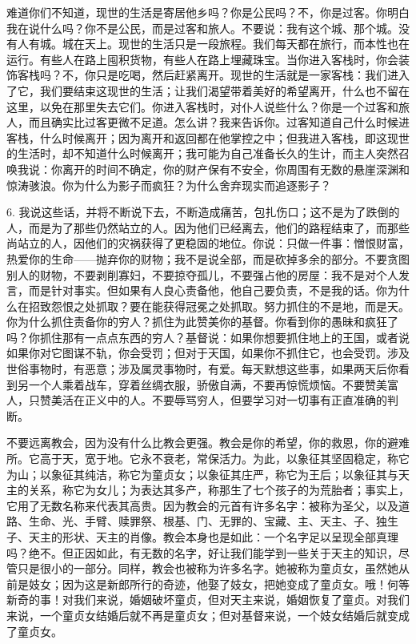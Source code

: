 难道你们不知道，现世的生活是寄居他乡吗？你是公民吗？不，你是过客。你明白我在说什么吗？你不是公民，而是过客和旅人。不要说：我有这个城、那个城。没有人有城。城在天上。现世的生活只是一段旅程。我们每天都在旅行，而本性也在运行。有些人在路上囤积货物，有些人在路上埋藏珠宝。当你进入客栈时，你会装饰客栈吗？不，你只是吃喝，然后赶紧离开。现世的生活就是一家客栈：我们进入了它，我们要结束这现世的生活；让我们渴望带着美好的希望离开，什么也不留在这里，以免在那里失去它们。你进入客栈时，对仆人说些什么？你是一个过客和旅人，而且确实比过客更微不足道。怎么讲？我来告诉你。过客知道自己什么时候进客栈，什么时候离开；因为离开和返回都在他掌控之中；但我进入客栈，即这现世的生活时，却不知道什么时候离开；我可能为自己准备长久的生计，而主人突然召唤我说：你离开的时间不确定，你的财产保有不安全，你周围有无数的悬崖深渊和惊涛骇浪。你为什么为影子而疯狂？为什么舍弃现实而追逐影子？\par

6. 我说这些话，并将不断说下去，不断造成痛苦，包扎伤口；这不是为了跌倒的人，而是为了那些仍然站立的人。因为他们已经离去，他们的路程结束了，而那些尚站立的人，因他们的灾祸获得了更稳固的地位。你说：只做一件事：憎恨财富，热爱你的生命——抛弃你的财物；我不是说全部，而是砍掉多余的部分。不要贪图别人的财物，不要剥削寡妇，不要掠夺孤儿，不要强占他的房屋：我不是对个人发言，而是针对事实。但如果有人良心责备他，他自己要负责，不是我的话。你为什么在招致怨恨之处抓取？要在能获得冠冕之处抓取。努力抓住的不是地，而是天。你为什么抓住责备你的穷人？抓住为此赞美你的基督。你看到你的愚昧和疯狂了吗？你抓住那有一点点东西的穷人？基督说：如果你想要抓住地上的王国，或者说如果你对它图谋不轨，你会受罚；但对于天国，如果你不抓住它，也会受罚。涉及世俗事物时，有恶意；涉及属灵事物时，有爱。每天默想这些事，如果两天后你看到另一个人乘着战车，穿着丝绸衣服，骄傲自满，不要再惊慌烦恼。不要赞美富人，只赞美活在正义中的人。不要辱骂穷人，但要学习对一切事有正直准确的判断。\par

不要远离教会，因为没有什么比教会更强。教会是你的希望，你的救恩，你的避难所。它高于天，宽于地。它永不衰老，常保活力。为此，以象征其坚固稳定，称它为山；以象征其纯洁，称它为童贞女；以象征其庄严，称它为王后；以象征其与天主的关系，称它为女儿；为表达其多产，称那生了七个孩子的为荒胎者；事实上，它用了无数名称来代表其高贵。因为教会的元首有许多名字：被称为圣父，以及道路、生命、光、手臂、赎罪祭、根基、门、无罪的、宝藏、主、天主、子、独生子、天主的形状、天主的肖像。教会本身也是如此：一个名字足以呈现全部真理吗？绝不。但正因如此，有无数的名字，好让我们能学到一些关于天主的知识，尽管只是很小的一部分。同样，教会也被称为许多名字。她被称为童贞女，虽然她从前是妓女；因为这是新郎所行的奇迹，他娶了妓女，把她变成了童贞女。哦！何等新奇的事！对我们来说，婚姻破坏童贞，但对天主来说，婚姻恢复了童贞。对我们来说，一个童贞女结婚后就不再是童贞女；但对基督来说，一个妓女结婚后就变成了童贞女。\par

